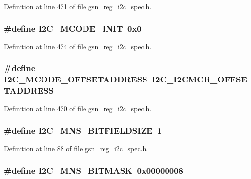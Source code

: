 Definition at line 431 of file gsn\_\-reg\_\-i2c\_\-spec.h.

\hypertarget{a00558_ab9511a7c6cf9c37f6f753bd7f33ab966}{
\subsubsection[{I2C\_\-MCODE\_\-INIT}]{\setlength{\rightskip}{0pt plus 5cm}\#define I2C\_\-MCODE\_\-INIT~0x0}}
\label{a00558_ab9511a7c6cf9c37f6f753bd7f33ab966}


Definition at line 434 of file gsn\_\-reg\_\-i2c\_\-spec.h.

\hypertarget{a00558_ad32b34f7cf59bd26528948fa6e0b004c}{
\subsubsection[{I2C\_\-MCODE\_\-OFFSETADDRESS}]{\setlength{\rightskip}{0pt plus 5cm}\#define I2C\_\-MCODE\_\-OFFSETADDRESS~I2C\_\-I2CMCR\_\-OFFSETADDRESS}}
\label{a00558_ad32b34f7cf59bd26528948fa6e0b004c}


Definition at line 430 of file gsn\_\-reg\_\-i2c\_\-spec.h.

\hypertarget{a00558_a04a6edbd066ec38abbc10af5d5d0a8b8}{
\subsubsection[{I2C\_\-MNS\_\-BITFIELDSIZE}]{\setlength{\rightskip}{0pt plus 5cm}\#define I2C\_\-MNS\_\-BITFIELDSIZE~1}}
\label{a00558_a04a6edbd066ec38abbc10af5d5d0a8b8}


Definition at line 88 of file gsn\_\-reg\_\-i2c\_\-spec.h.

\hypertarget{a00558_a7228d938b84af17d2d41624ec7139d2e}{
\subsubsection[{I2C\_\-MNS\_\-BITMASK}]{\setlength{\rightskip}{0pt plus 5cm}\#define I2C\_\-MNS\_\-BITMASK~0x00000008}}
\label{a00558_a7228d938b84af17d2d41624ec7139d2e}


